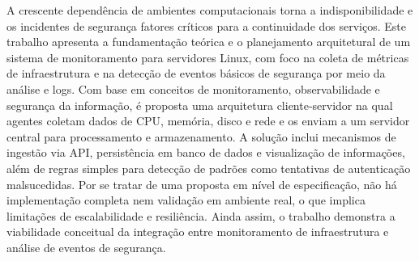 \documentclass[
    12pt
    ,oneside
    ,a4paper
    ,chapter=TITLE
    ,section=TITLE
    ,sumario=abnt-6027-2012]{abntex2}
\begin{document}

\imprimircapa
\imprimirfolhaderosto

\begin{resumo}
    A crescente dependência de ambientes computacionais torna a indisponibilidade e os incidentes de segurança fatores críticos para a continuidade dos serviços. Este trabalho apresenta a fundamentação teórica e o planejamento arquitetural de um sistema de monitoramento para servidores Linux, com foco na coleta de métricas de infraestrutura e na detecção de eventos básicos de segurança por meio da análise e logs. Com base em conceitos de monitoramento, observabilidade e segurança da informação, é proposta uma arquitetura cliente-servidor na qual agentes coletam dados de CPU, memória, disco e rede e os enviam a um servidor central para processamento e armazenamento. A solução inclui mecanismos de ingestão via API, persistência em banco de dados e visualização de informações, além de regras simples para detecção de padrões como tentativas de autenticação malsucedidas. Por se tratar de uma proposta em nível de especificação, não há implementação completa nem validação em ambiente real, o que implica limitações de escalabilidade e resiliência. Ainda assim, o trabalho demonstra a viabilidade conceitual da integração entre monitoramento de infraestrutura e análise de eventos de segurança.

\end{resumo}

\listadefiguras
\listadecodigos
\end{document}
